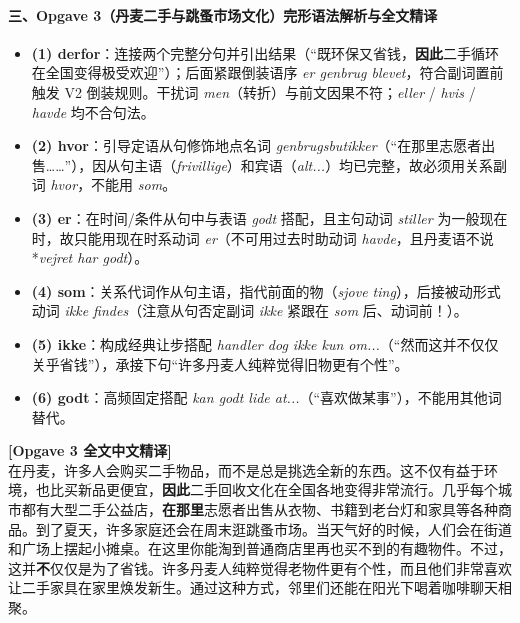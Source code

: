 \paragraph*{三、Opgave 3（丹麦二手与跳蚤市场文化）完形语法解析与全文精译}
\begin{itemize}
  \item \textbf{(1) derfor}：连接两个完整分句并引出结果（“既环保又省钱，\textbf{因此}二手循环在全国变得极受欢迎”）；后面紧跟倒装语序 \textit{er genbrug blevet}，符合副词置前触发 V2 倒装规则。干扰词 \textit{men}（转折）与前文因果不符；\textit{eller} / \textit{hvis} / \textit{havde} 均不合句法。
  \item \textbf{(2) hvor}：引导定语从句修饰地点名词 \textit{genbrugsbutikker}（“在那里志愿者出售……”），因从句主语（\textit{frivillige}）和宾语（\textit{alt...}）均已完整，故必须用关系副词 \textit{hvor}，不能用 \textit{som}。
  \item \textbf{(3) er}：在时间/条件从句中与表语 \textit{godt} 搭配，且主句动词 \textit{stiller} 为一般现在时，故只能用现在时系动词 \textit{er}（不可用过去时助动词 \textit{havde}，且丹麦语不说 *\textit{vejret har godt}）。
  \item \textbf{(4) som}：关系代词作从句主语，指代前面的物（\textit{sjove ting}），后接被动形式动词 \textit{ikke findes}（注意从句否定副词 \textit{ikke} 紧跟在 \textit{som} 后、动词前！）。
  \item \textbf{(5) ikke}：构成经典让步搭配 \textit{handler dog ikke kun om...}（“然而这并不仅仅关乎省钱”），承接下句“许多丹麦人纯粹觉得旧物更有个性”。
  \item \textbf{(6) godt}：高频固定搭配 \textit{kan godt lide at...}（“喜欢做某事”），不能用其他词替代。
\end{itemize}

\begin{transbox}
\small
\textbf{\color{NCDTeal}[Opgave 3 全文中文精译]}\\
在丹麦，许多人会购买二手物品，而不是总是挑选全新的东西。这不仅有益于环境，也比买新品更便宜，\textbf{因此}二手回收文化在全国各地变得非常流行。几乎每个城市都有大型二手公益店，\textbf{在那里}志愿者出售从衣物、书籍到老台灯和家具等各种商品。到了夏天，许多家庭还会在周末逛跳蚤市场。当天气好的时候，人们会在街道和广场上摆起小摊桌。在这里你能淘到普通商店里再也买不到的有趣物件。不过，这并\textbf{不}仅仅是为了省钱。许多丹麦人纯粹觉得老物件更有个性，而且他们非常喜欢让二手家具在家里焕发新生。通过这种方式，邻里们还能在阳光下喝着咖啡聊天相聚。
\end{transbox}

